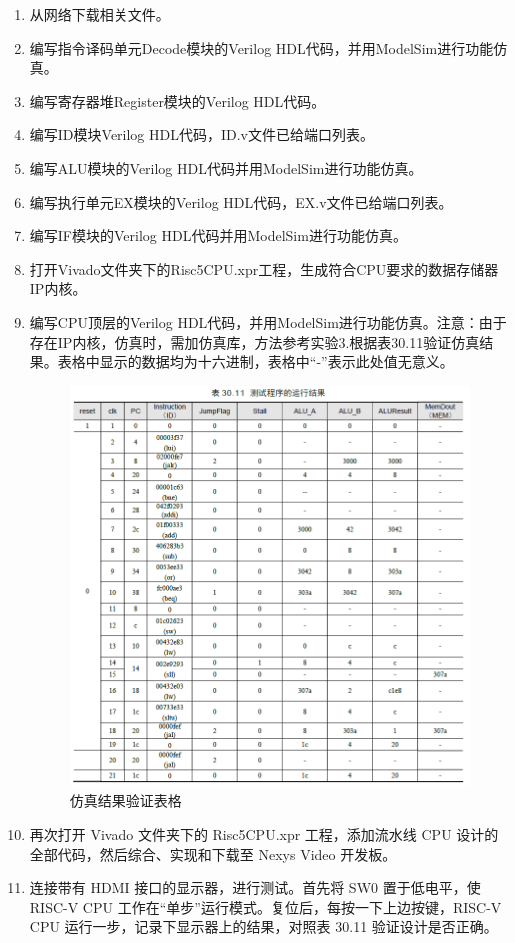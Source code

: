 \documentclass[12pt,hyperref,a4paper,UTF8]{ctexart}
\begin{document}
\begin{enumerate}
    \item 从网络下载相关文件。
    \item 编写指令译码单元Decode模块的Verilog HDL代码，并用ModelSim进行功能仿真。
    \item 编写寄存器堆Register模块的Verilog HDL代码。
    \item 编写ID模块Verilog HDL代码，ID.v文件已给端口列表。
    \item 编写ALU模块的Verilog HDL代码并用ModelSim进行功能仿真。
    \item 编写执行单元EX模块的Verilog HDL代码，EX.v文件已给端口列表。
    \item 编写IF模块的Verilog HDL代码并用ModelSim进行功能仿真。
    \item 打开Vivado文件夹下的Risc5CPU.xpr工程，生成符合CPU要求的数据存储器IP内核。
    \item 编写CPU顶层的Verilog HDL代码，并用ModelSim进行功能仿真。注意：由于存在IP内核，仿真时，需加仿真库，方法参考实验3.根据表30.11验证仿真结果。表格中显示的数据均为十六进制，表格中“-”表示此处值无意义。
\begin{figure}[H]
    \centering
    \includegraphics[width=1\textwidth]{figures/fig/image1.png}
    \caption{仿真结果验证表格}
\end{figure}
    \item 再次打开 Vivado 文件夹下的 Risc5CPU.xpr 工程，添加流水线 CPU 设计的全部代码，然后综合、实现和下载至 Nexys Video 开发板。
    \item 连接带有 HDMI 接口的显示器，进行测试。首先将 SW0 置于低电平，使 RISC-V CPU 工作在“单步”运行模式。复位后，每按一下上边按键，RISC-V CPU 运行一步，记录下显示器上的结果，对照表 30.11 验证设计是否正确。



\end{enumerate}
\end{document}
